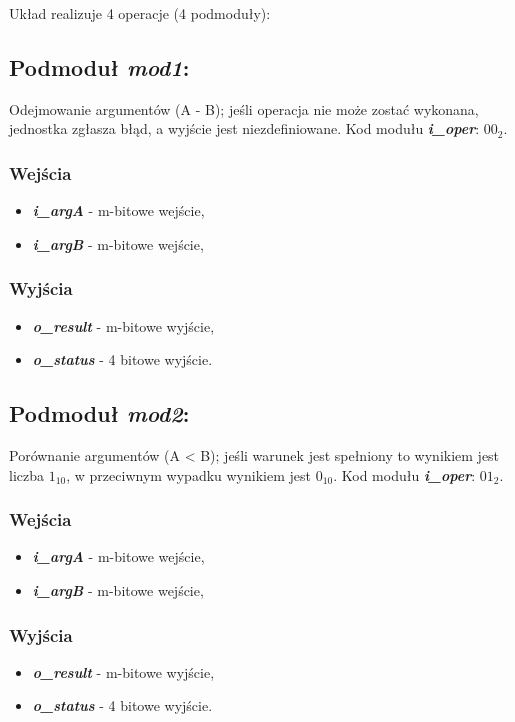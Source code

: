 Układ realizuje 4 operacje (4 podmoduły):

\subsection{Podmoduł \emph{mod1}:}
Odejmowanie argumentów (A -  B); jeśli operacja nie może zostać wykonana, jednostka zgłasza błąd, a wyjście jest niezdefiniowane. Kod modułu \textbf{\emph{i\_oper}}: \(00_2\).

\subsubsection*{Wejścia}
\begin{itemize}
	\item \emph{\textbf{i\_argA}} - m-bitowe wejście,
	\item \emph{\textbf{i\_argB}} - m-bitowe wejście,
\end{itemize}
\subsubsection*{Wyjścia}
\begin{itemize} 
	\item \emph{\textbf{o\_result}} - m-bitowe wyjście,
	\item \emph{\textbf{o\_status}} - 4 bitowe wyjście.
\end{itemize}

\subsection{Podmoduł \emph{mod2}:}
Porównanie argumentów (A < B); jeśli warunek jest spełniony to wynikiem jest liczba \(1_{10}\), w przeciwnym wypadku wynikiem jest \(0_{10}\). Kod modułu \textbf{\emph{i\_oper}}: \(01_2\).

\subsubsection*{Wejścia}
\begin{itemize}
	\item \emph{\textbf{i\_argA}} - m-bitowe wejście,
	\item \emph{\textbf{i\_argB}} - m-bitowe wejście,
\end{itemize}
\subsubsection*{Wyjścia}
\begin{itemize}
	\item \emph{\textbf{o\_result}} - m-bitowe wyjście,
	\item \emph{\textbf{o\_status}} - 4 bitowe wyjście.
\end{itemize}

